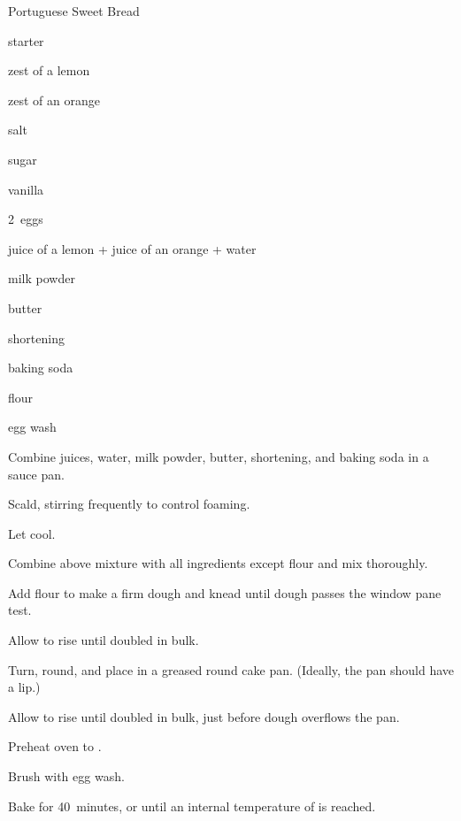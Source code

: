 \begin{recipe}{Portuguese Sweet Bread}{}{}

\begin{ingredients}
\item {} starter
\item zest of a lemon
\item zest of an orange
\item {} salt
\item {} sugar
\item {} vanilla
\item 2~eggs
\item {} juice of a lemon + juice of an orange + water
\item {} milk powder
\item {} butter
\item {} shortening
\item {} baking soda
\item {} flour
\item egg wash
\end{ingredients}

\begin{directions}
\item Combine juices, water, milk powder, butter, shortening, and baking soda in a sauce pan.
\item Scald, stirring frequently to control foaming.
\item Let cool.
\item Combine above mixture with all ingredients except flour and mix thoroughly.
\item Add flour to make a firm dough and knead until dough passes the window pane test.
\item Allow to rise until doubled in bulk.
\item Turn, round, and place in a greased round cake pan. (Ideally, the pan should have a lip.)
\item Allow to rise until doubled in bulk, just before dough overflows the pan.
\item Preheat oven to .
\item Brush with egg wash.
\item Bake for 40~minutes, or until an internal temperature of  is reached.
\end{directions}

\end{recipe}
